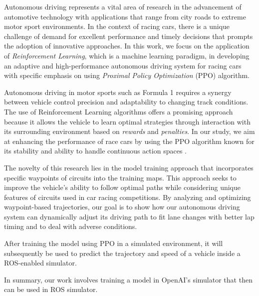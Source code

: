 \documentclass[conference]{IEEEtran}
\begin{document}



Autonomous driving represents a vital area of research in the advancement of automotive technology with applications that range from city roads to extreme motor sport environments.
%
In the context of racing cars, there is a unique challenge of demand for excellent performance and timely decisions that prompts the adoption of innovative approaches.
%
In this work, we focus on the application of \emph{Reinforcement Learning}, which is a machine learning paradigm, in developing an adaptive and high-performance autonomous driving system for racing cars with specific emphasis on using \emph{Proximal Policy Optimization} (PPO) algorithm.

Autonomous driving in motor sports such as Formula 1 requires a synergy between vehicle control precision and adaptability to changing track conditions.
%
The use of Reinforcement Learning algorithms offers a promising approach because it allows the vehicle to learn optimal strategies through interaction with its surrounding environment based on \emph{rewards} and \emph{penalties}.
%
In our study, we aim at enhancing the performance of race cars by using the PPO algorithm known for its stability and ability to handle continuous action spaces \cite{PPOOpenAI}.

The novelty of this research lies in the model training approach that incorporates specific waypoints of circuits into the training maps.
%
This approach seeks to improve the vehicle’s ability to follow optimal paths while considering unique features of circuits used in car racing competitions.
%
By analyzing and optimizing waypoint-based trajectories, our goal is to show how our autonomous driving system can dynamically adjust its driving path to fit lane changes with better lap timing and to deal with adverse conditions.

After training the model using PPO in a simulated environment, it will subsequently be used to predict the trajectory and speed of a vehicle inside a ROS-enabled simulator.

In summary, our work involves training a model in OpenAI’s simulator that then can be used in ROS simulator.
\end{document}
